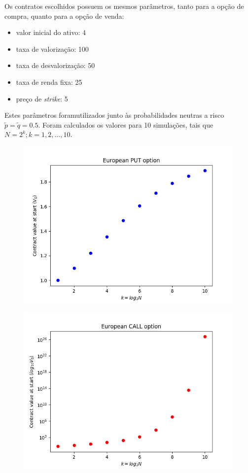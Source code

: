 \documentclass{article}
\begin{document}
Os contratos escolhidos possuem os mesmos parâmetros, tanto para a opção de compra, quanto para a opção de venda:

\begin{itemize}
	\item valor inicial do ativo: 4
	\item taxa de valorização: 100%
	\item taxa de desvalorização: 50%
	\item taxa de renda fixa: 25%
	\item preço de \emph{strike}: 5
\end{itemize}

Estes parâmetros foramutilizados junto às probabilidades neutras a risco $\tilde{p} = \tilde{q} = 0.5$.
Foram calculados os valores para 10 simulações, tais que $N = 2^{k}; k = 1, 2, ..., 10$.


\begin{figure}[]
	\includegraphics[width=\linewidth*9/10]{Figure_0.png}
	\centering
	
	\label{}
\end{figure}


\begin{figure}[]
	\includegraphics[width=\linewidth*9/10]{Figure_1.png}
	\centering
	
	\label{}
\end{figure}
\end{document}
